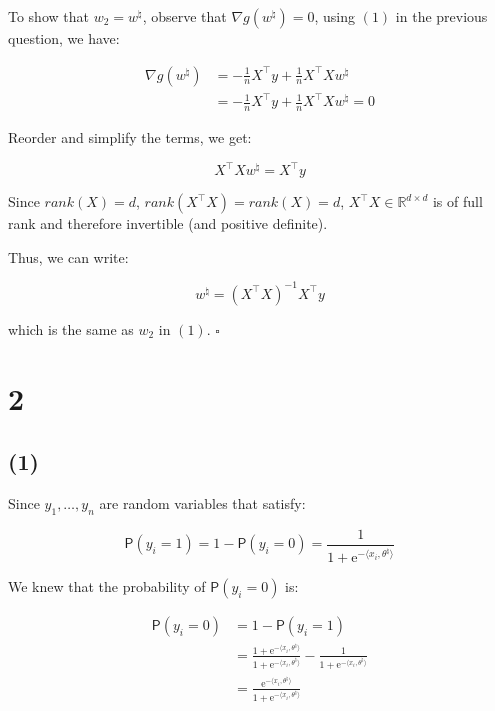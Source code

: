 \documentclass{article}
\begin{document}
To show that $w_2 = w^\natural$, observe that $\nabla g(w^\natural) = 0$, using $(1)$ in the previous question, we have: 

\begin{equation*}
    \begin{split}
        \nabla g(w^\natural) 
            &= - \frac{1}{n} X^\intercal y + \frac{1}{n} X^\intercal Xw^\natural \\
            &= - \frac{1}{n} X^\intercal y + \frac{1}{n} X^\intercal Xw^\natural = 0
    \end{split}
\end{equation*}

Reorder and simplify the terms, we get:

\begin{equation*}
    X^\intercal Xw^\natural = X^\intercal y
\end{equation*}

Since $rank(X) = d$, $rank(X^\intercal X) = rank(X) = d$, 
$X^\intercal X \in \mathbb{R}^{d \times d}$ is of full rank
and therefore invertible (and positive definite).

Thus, we can write:

\begin{equation*}
    w^\natural = (X^\intercal X)^{-1} X^\intercal y
\end{equation*}

which is the same as $w_2$ in $(1)$. $\square$

\section*{2}
\subsection*{(1)}

Since $y_1,\dots ,y_n$ are random variables that satisfy:

\begin{equation*}
    \mathsf{P} ( y_i = 1 ) = 1 - \mathsf{P} ( y_i = 0 ) = \frac{1}{1 + \mathrm{e}^{- \langle x_i, \theta^\natural \rangle}} 
\end{equation*}

We knew that the probability of $\mathsf{P} ( y_i = 0 )$ is:

\begin{equation*}
    \begin{split}
        \mathsf{P} ( y_i = 0 ) 
        &= 1 - \mathsf{P} ( y_i = 1 ) \\
        &= \frac{1 + \mathrm{e}^{- \langle x_i, \theta^\natural \rangle}}{1 + \mathrm{e}^{- \langle x_i, \theta^\natural \rangle}} - \frac{1}{1 + \mathrm{e}^{- \langle x_i, \theta^\natural \rangle}} \\
        &= \frac{\mathrm{e}^{-\langle x_i, \theta^\natural \rangle}}{1 + \mathrm{e}^{-\langle x_i, \theta^\natural \rangle}} 
    \end{split}
\end{equation*}
\end{document}
